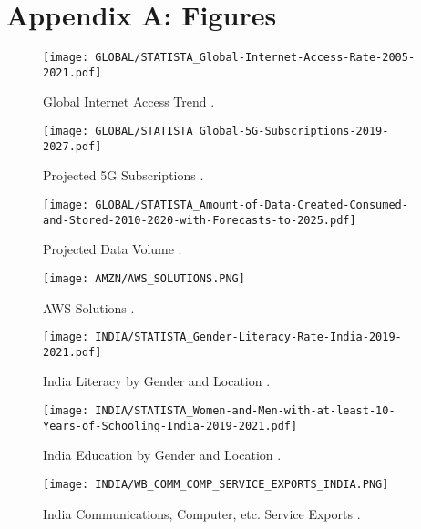 \documentclass[a4paper, 12pt]{article}
\begin{document}
    \section*{Appendix A: Figures}
    \begin{figure}[ht]
       \centering
       \texttt{[image: GLOBAL/STATISTA\_Global-Internet-Access-Rate-2005-2021.pdf]}
       \caption{Global Internet Access Trend \cite{GLOBAL_INTERNET_ACCESS}.}
       \label{fig:GLOBAL_INTERNET_ACCESS}
    \end{figure}
    \begin{figure}[ht]
       \centering
       \texttt{[image: GLOBAL/STATISTA\_Global-5G-Subscriptions-2019-2027.pdf]}
       \caption{Projected 5G Subscriptions \cite{GLOBAL_5G}.}
       \label{fig:PROJECTED_5G}
    \end{figure}
    \begin{figure}[ht]
       \centering
       \texttt{[image: GLOBAL/STATISTA\_Amount-of-Data-Created-Consumed-and-Stored-2010-2020-with-Forecasts-to-2025.pdf]}
       \caption{Projected Data Volume \cite{TOTAL_DATA_VOLUME}.}
       \label{fig:TOTAL_DATA_VOLUME}
    \end{figure}
    \begin{figure}[ht]
       \centering
       \texttt{[image: AMZN/AWS\_SOLUTIONS.PNG]}
       \caption{AWS Solutions \cite{AMZN_ABOUT_AWS}.}
       \label{fig:AWS_SOLUTIONS}
    \end{figure}
    \begin{figure}[ht]
       \centering
       \texttt{[image: INDIA/STATISTA\_Gender-Literacy-Rate-India-2019-2021.pdf]}
       \caption{India Literacy by Gender and Location \cite{INDIA_LITERACY}.}
       \label{fig:LITERACY_INDIA}
    \end{figure}
    \begin{figure}[ht]
       \centering
       \texttt{[image: INDIA/STATISTA\_Women-and-Men-with-at-least-10-Years-of-Schooling-India-2019-2021.pdf]}
       \caption{India Education by Gender and Location \cite{INDIA_EDUCATION_10_YEARS}.}
       \label{fig:EDUCATIONAL_ATTAINMENT_INDIA}
    \end{figure}
    \begin{figure}[ht]
       \centering
       \texttt{[image: INDIA/WB\_COMM\_COMP\_SERVICE\_EXPORTS\_INDIA.PNG]}
       \caption{India Communications, Computer, etc. Service Exports \cite{WB_COMM_COMP_SERVICE_EXPORTS_INDIA}.}
       \label{fig:WB_COMM_COMP_SERVICE_EXPORTS_INDIA}
    \end{figure}
\end{document}
